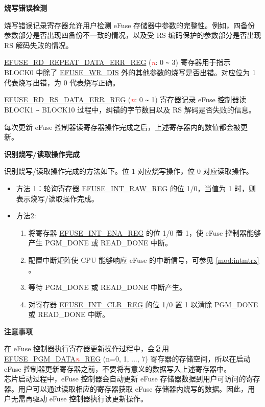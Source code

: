 \documentclass[main\_\_CN.tex]{subfiles}
\begin{document}
{\bfseries 烧写错误检测}

烧写错误记录寄存器允许用户检测 eFuse 存储器中参数的完整性。例如，四备份参数部分是否出现四备份不一致的情况，以及受  RS 编码保护的参数部分是否出现 RS 解码失败的情况。

\hyperref[regdesc:EFUSERDREPEATDATAERR0REG]{EFUSE\_RD\_REPEAT\_DATA\_ERR\_REG} (\textcolor{red}{\it{n}}: 0 \verb+~+ 3) 寄存器用于指示 BLOCK0 中除了 \hyperref[fielddesc:EFUSEWRDIS]{EFUSE\_WR\_DIS} 外的其他参数的烧写是否出错。对应位为 1 代表烧写出错，为 0 代表烧写正确。

\hyperref[regdesc:EFUSERDRSDATAERR0REG]{EFUSE\_RD\_RS\_DATA\_ERR\_REG} (\textcolor{red}{\it{n}}: 0 \verb+~+ 1) 寄存器记录 eFuse 控制器读 BLOCK1 \verb+~+ BLOCK10 过程中，纠错的字节数目以及 RS 解码是否失败的信息。

每次更新 eFuse 控制器读寄存器操作完成之后，上述寄存器内的数值都会被更新。

{\bfseries 识别烧写/读取操作完成}

识别烧写/读取操作完成的方法如下。位 1 对应烧写操作，位 0 对应读取操作。
\begin{itemize}

    \item 方法 1：轮询寄存器 \hyperref[regdesc:EFUSEINTRAWREG]{EFUSE\_INT\_RAW\_REG} 的位 1/0，当值为 1 时，则表示烧写/读取操作完成。
    \item 方法2:
        \begin{enumerate}
            \item 将寄存器 \hyperref[regdesc:EFUSEINTENAREG]{EFUSE\_INT\_ENA\_REG} 的位 1/0 置 1，使 eFuse 控制器能够产生 PGM\_DONE 或 READ\_DONE 中断。
            \item 配置中断矩阵使 CPU 能够响应 eFuse 的中断信号，可参见 \ref{mod:intmtrx} \textit{}。

            \item 等待 PGM\_DONE 或 READ\_DONE 中断产生。

            \item 对寄存器 \hyperref[regdesc:EFUSEINTCLRREG]{EFUSE\_INT\_CLR\_REG} 的位 1/0 置 1 以清除 PGM\_DONE 或 READ\_DONE 中断。
    \end{enumerate}
\end{itemize}

{\bfseries 注意事项}

在 eFuse 控制器执行寄存器更新操作过程中，会复用 \hyperref[regdesc:EFUSEPGMDATANREG]{EFUSE\_PGM\_DATA\textcolor{red}{\it{n}}\_REG} (n=0, 1, ..., 7) 寄存器的存储空间，所以在启动 eFuse 控制器更新寄存器之前，不要将有意义的数据写入上述寄存器中。\\
芯片启动过程中，eFuse 控制器会自动更新 eFuse 存储器数据到用户可访问的寄存器。用户可以通过读取相应的寄存器获取 eFuse 存储器内烧写的数据。因此，用户无需再驱动 eFuse 控制器执行读更新操作。
\end{document}
